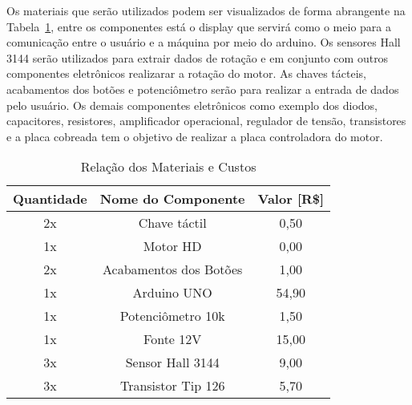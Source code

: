 \documentclass[journal]{IEEEtran}
\begin{document}
Os materiais que serão utilizados podem ser visualizados de forma abrangente na Tabela~\ref{tab:tabela2}, entre os componentes está o display que servirá como o meio para a comunicação entre o usuário e a máquina por meio do arduino. Os sensores Hall 3144 \cite{Halldata:2005} serão utilizados para extrair dados de rotação e em conjunto com outros componentes eletrônicos realizarar a rotação do motor. As chaves tácteis, acabamentos dos botões e potenciômetro serão para realizar a entrada de dados pelo usuário. Os demais componentes eletrônicos como exemplo dos diodos, capacitores, resistores, amplificador operacional, regulador de tensão, transistores e a placa cobreada tem o objetivo de realizar a placa controladora do motor.


\begin{table}[!htpb]
\renewcommand{\arraystretch}{1.3}
\caption{Relação dos Materiais e Custos}
\label{tab:tabela2}
\centering
\begin{tabular}{c|c|c|}
\hline
\multicolumn{1}{|c|}{\textbf{Quantidade}} & \multicolumn{1}{c|}{\textbf{Nome do Componente}} & \multicolumn{1}{c|}{\textbf{Valor {[}R\${]}}} \\ \hline
\multicolumn{1}{|c|}{2x}                  & Chave táctil                                     & 0,50                                          \\ \hline
\multicolumn{1}{|c|}{1x}                  & Motor HD                                         & 0,00                                          \\ \hline
\multicolumn{1}{|c|}{2x}                  & Acabamentos dos Botões                           & 1,00                                          \\ \hline
\multicolumn{1}{|c|}{1x}                  & Arduino UNO                                      & 54,90                                         \\ \hline
\multicolumn{1}{|c|}{1x}                  & Potenciômetro 10k                                & 1,50                                          \\ \hline
\multicolumn{1}{|c|}{1x}                  & Fonte 12V                                        & 15,00                                         \\ \hline
\multicolumn{1}{|c|}{3x}                  & Sensor Hall 3144                                 & 9,00                                          \\ \hline
\multicolumn{1}{|c|}{3x}                  & Transistor Tip 126                               & 5,70                                          \\ \hline

\end{tabular}
\end{table}
\end{document}
